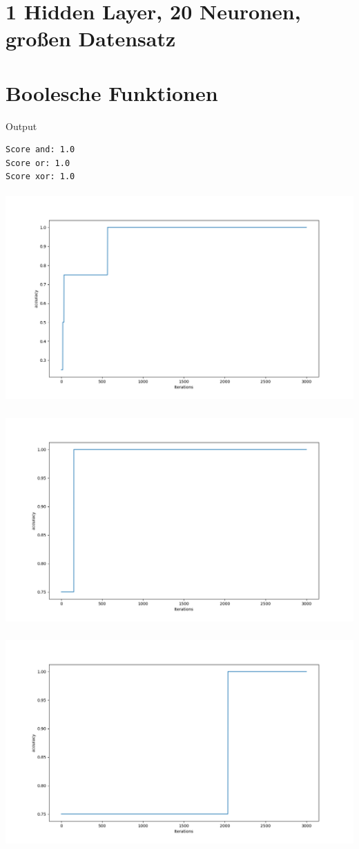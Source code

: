 \section*{1 Hidden Layer, 20 Neuronen, großen Datensatz}


\section*{Boolesche Funktionen}

Output
\begin{lstlisting}
Score and: 1.0
Score or: 1.0
Score xor: 1.0

\end{lstlisting}

\includegraphics[height=8cm]{./nn_and.png}

\includegraphics[height=8cm]{./nn_or.png}

\includegraphics[height=8cm]{./nn_xor.png}


